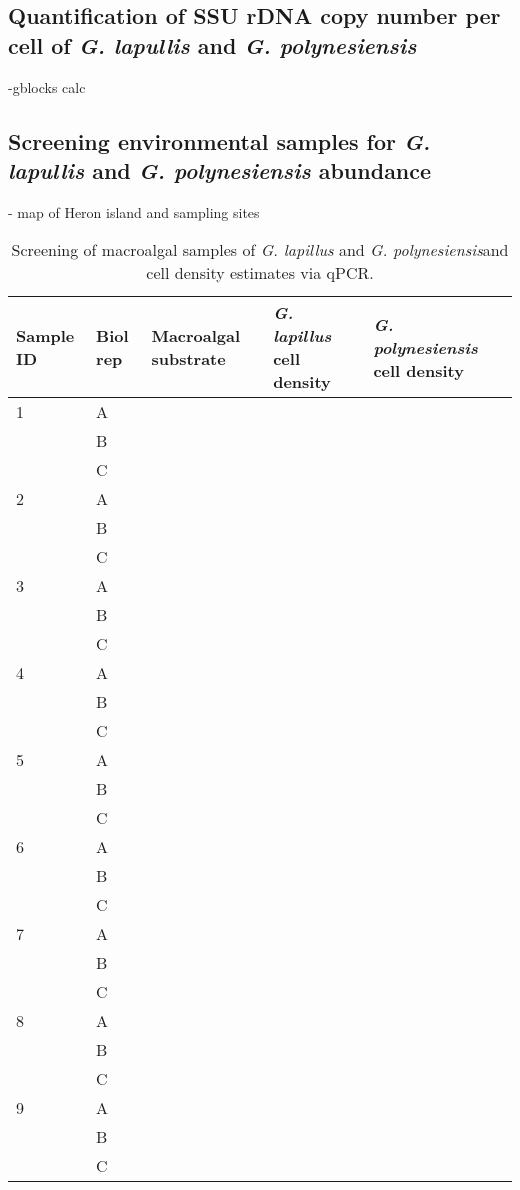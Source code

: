 \documentclass[12pt]{article}
\begin{document}
\subsection{Quantification of SSU rDNA copy number per cell of \emph{G. lapullis} and \emph{G. polynesiensis}}
-gblocks calc 
\subsection{Screening environmental samples for \emph{G. lapullis} and \emph{G. polynesiensis} abundance}
- map of Heron island and sampling sites
\FloatBarrier
\begin{longtable}{ | p{1cm} | p{1cm} | p{3cm} | p{4cm} | p{4cm} | }
\caption{Screening of macroalgal samples of \emph{G. lapillus} and \emph{G. polynesiensis}and cell density estimates via qPCR.}\\
\hline
\label{tbl:MacroalgaeTable}
\textbf{Sample ID}&\textbf{Biol rep}&\textbf{Macroalgal substrate}&\textbf{\textit{G. lapillus} cell density}&\textbf{\textit{G. polynesiensis} cell density}\\
\hline
1&A&&&\\
\hline
&B&&&\\
\hline
&C&&&\\
\hline
2&A&&&\\
\hline
&B&&&\\
\hline
&C&&&\\
\hline
3&A&&&\\
\hline
&B&&&\\
\hline
&C&&&\\
\hline
4&A&&&\\
\hline
&B&&&\\
\hline
&C&&&\\
\hline
5&A&&&\\
\hline
&B&&&\\
\hline
&C&&&\\
\hline
6&A&&&\\
\hline
&B&&&\\
\hline
&C&&&\\
\hline
7&A&&&\\
\hline
&B&&&\\
\hline
&C&&&\\
\hline
8&A&&&\\
\hline
&B&&&\\
\hline
&C&&&\\
\hline
9&A&&&\\
\hline
&B&&&\\
\hline
&C&&&\\

\end{longtable}
\end{document}
